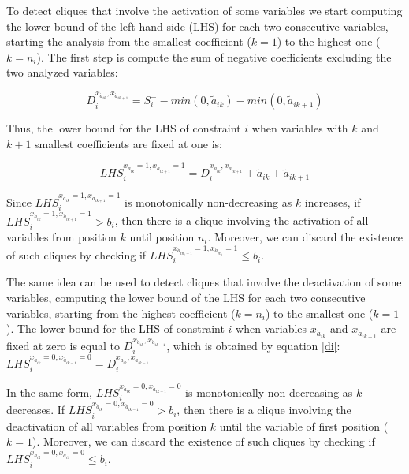 \documentclass{endm}
\begin{document}
To detect cliques that involve the activation of some variables we start computing the lower bound of the left-hand side (LHS) for each two consecutive variables, starting the analysis from the smallest coefficient ($k=1$) to the highest one ($k=n_i$). The first step is compute the sum of negative coefficients excluding the two analyzed variables:

\begin{equation}\label{di}
D_{i}^{x_{\acute{a}_{ik}}, x_{\acute{a}_{ik+1}}} = S_i^- - min(0, \tilde{a}_{ik}) - min(0, \tilde{a}_{ik+1})
\end{equation}

\noindent Thus, the lower bound for the LHS of constraint $i$ when variables with $k$ and $k+1$ smallest coefficients are fixed at one is:

\begin{equation}
LHS_{i}^{x_{\acute{a}_{ik}} = 1, x_{\acute{a}_{ik+1}} = 1} = D_{i}^{x_{\acute{a}_{ik}}, x_{\acute{a}_{ik+1}}} + \tilde{a}_{ik} + \tilde{a}_{ik+1}
\end{equation}

Since $LHS_{i}^{x_{\acute{a}_{ik}} = 1, x_{\acute{a}_{ik+1}} = 1}$ is monotonically non-decreasing as $k$ increases, if $LHS_{i}^{x_{\acute{a}_{ik}} = 1, x_{\acute{a}_{ik+1}} = 1} > b_{i}$, then there is a clique involving the activation of all variables from position $k$ until position $n_i$. Moreover, we can discard the existence of such cliques by checking if $LHS_{i}^{x_{\acute{a}_{in_i-1}} = 1, x_{\acute{a}_{in_i}} = 1} \leq b_i$.

The same idea can be used to detect cliques that involve the deactivation of some variables, computing the lower bound of the LHS for each two consecutive variables, starting from the highest coefficient ($k=n_i$) to the smallest one ($k=1$). The lower bound for the LHS of constraint $i$ when variables $x_{\acute{a}_{ik}}$ and $x_{\acute{a}_{ik-1}}$ are fixed at zero is equal to $D_{i}^{x_{\acute{a}_{ik}}, x_{\acute{a}_{ik-1}}}$, which is obtained by equation \ref{di}:  $LHS_{i}^{x_{\acute{a}_{ik}} = 0, x_{\acute{a}_{ik-1}} = 0} = D_{i}^{x_{\acute{a}_{ik}}, x_{\acute{a}_{ik-1}}} $


In the same form, $LHS_{i}^{x_{\acute{a}_{ik}} = 0, x_{\acute{a}_{ik-1}} = 0}$ is monotonically non-decreasing as $k$ decreases. If $LHS_{i}^{x_{\acute{a}_{ik}} = 0, x_{\acute{a}_{ik-1}} = 0} > b_{i}$, then there is a clique involving the deactivation of all variables from position $k$ until the variable of first position ($k=1$). Moreover, we can discard the existence of such cliques by checking if $LHS_{i}^{x_{\acute{a}_{i2}} = 0, x_{\acute{a}_{i1}} = 0} \leq b_i$.
\end{document}
